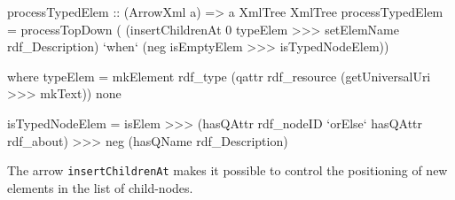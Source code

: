 \documentclass[11pt,a4paper,headsepline, bibtotoc]{scrreprt}
\begin{document}
\begin{code}[caption={Normalise Typed Node Elements},basicstyle=\ttfamily\small]
processTypedElem ::  (ArrowXml a) => a XmlTree XmlTree
processTypedElem 
  = processTopDown (
      (insertChildrenAt 0 typeElem 
       >>> setElemName rdf_Description)
      `when`  
      (neg isEmptyElem >>> isTypedNodeElem))

    where 
    typeElem 
      = mkElement rdf_type 
                  (qattr rdf_resource (getUniversalUri >>> mkText)) 
                  none
    
    isTypedNodeElem 
      = isElem  >>> (hasQAttr rdf_nodeID `orElse` hasQAttr rdf_about)
                >>> neg (hasQName rdf_Description)
\end{code}
The arrow \texttt{insertChildrenAt} makes it possible to control the positioning of new elements in the list of child-nodes.
\end{document}
